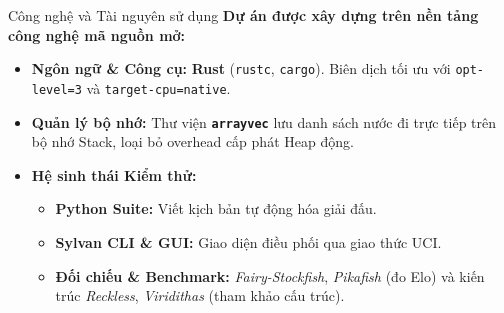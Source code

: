\begin{frame}{Công nghệ và Tài nguyên sử dụng}
    \textbf{Dự án được xây dựng trên nền tảng công nghệ mã nguồn mở:}
    \vspace{0.2cm}
    \begin{itemize}
        \item<1-> \textbf{Ngôn ngữ \& Công cụ:} \textbf{Rust} (\texttt{rustc}, \texttt{cargo}). Biên dịch tối ưu với \texttt{opt-level=3} và \texttt{target-cpu=native}.
        \item<2-> \textbf{Quản lý bộ nhớ:} Thư viện \textbf{\texttt{arrayvec}} lưu danh sách nước đi trực tiếp trên bộ nhớ Stack, loại bỏ overhead cấp phát Heap động.
        \item<3-> \textbf{Hệ sinh thái Kiểm thử:} 
        \begin{itemize}
            \item \textbf{Python Suite:} Viết kịch bản tự động hóa giải đấu.
            \item \textbf{Sylvan CLI \& GUI:} Giao diện điều phối qua giao thức UCI.
            \item \textbf{Đối chiếu \& Benchmark:} \textit{Fairy-Stockfish}, \textit{Pikafish} (đo Elo) và kiến trúc \textit{Reckless}, \textit{Viridithas} (tham khảo cấu trúc).
        \end{itemize}
    \end{itemize}
\end{frame}

